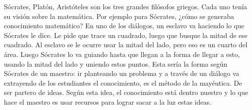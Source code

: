 Sócrates, Platón, Aristóteles son los tres grandes filósofos griegos. Cada uno tenía su visión sobre la matemática. Por ejemplo para Sócrates, ¿cómo se generaba conocimiento matemático? En uno de los diálogos, un esclavo va haciendo lo que Sócrates le dice. Le pide que trace un cuadrado, luego que busque la mitad de ese cuadrado. Al esclavo se le ocurre usar la mitad del lado, pero eso es un cuarto del área. Luego Sócrates lo va guiando hasta que llegan a la forma de llegar a esto, usando la mitad del lado y uniendo estos puntos. Esta sería la forma según Sócrates de un maestro: ir planteando un problema y a través de un diálogo va extrayendo de los estudiantes el conocimiento, es el método de la mayéutica. De ser partero de ideas. Según esta idea, el conocimiento está dentro nuestro y lo que hace el maestro es usar recursos para lograr sacar a la luz estas ideas.